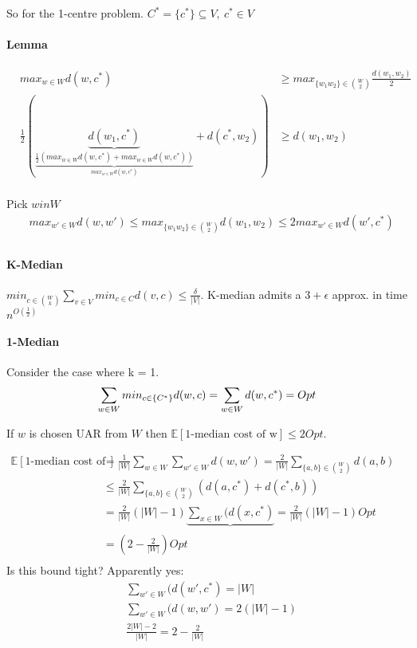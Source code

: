 \documentclass[]{article}
\begin{document}
So for the 1-centre problem. $ C^* = \{c^*\} \subseteq V,\ c^* \in V $\\
\paragraph{Lemma} 

\begin{align*}
&max_{w \in W} d(w, c^*) &\geq max_{\{w_1w_2\} \in {W \choose 2}} \frac{d(w_1, w_2)}{2}\\
&\frac{1}{2}(\underbrace{d(w_1, c^*)}_{\underbrace{\frac{1}{2}(max_{w \in W} d(w, c^*) + max_{w \in W} d(w, c^*))}_{max_{w \in W} d(w, c^*)}} + d(c^*, w_2) )&\geq d(w_1, w_2)\\
\end{align*}

Pick $ w in W $
\begin{align*}
&max_{w' \in W} d(w, w') \leq max_{\{w_1w_2\} \in {W \choose 2}} d(w_1, w_2) \leq 2max_{w' \in W} d(w', c^*)\\
\end{align*}

\paragraph{K-Median} $  min_{c \in {W \choose k}}  \sum\limits_{v \in V} min_{c \in C} d(v, c) \leq \frac{\delta}{|V|}$. K-median admits a $ 3+\epsilon $ approx. in time $n^{O(\frac{1}{2})}$

\paragraph{1-Median} Consider the case where k = 1.
\[
\sum\limits_{w\in W} min_{c\in \{C^*\}} d(w, c) = \sum\limits_{w\in W} d(w, c^*) = Opt\\
\]

If $ w $ is chosen UAR from $ W $ then $ \mathbb{E}[\text{1-median cost of w}] \leq 2Opt $. 

\begin{align*}
\mathbb{E}[\text{1-median cost of w}] &= \frac{1}{|W|} \sum\limits_{w\in W} \sum\limits_{w' \in W} d(w, w') = \frac{2}{|W|} \sum\limits_{\{a,b\} \in {W\choose 2}} d(a,b)\\
&\leq \frac{2}{|W|} \sum\limits_{\{a,b\} \in {W\choose 2}} \left(d(a,c^*) + d(c^*, b)\right)\\
&= \frac{2}{|W|}(|W|-1) \underbrace{\sum\limits_{x \in W} (d(x,c^*)}_{} = \frac{2}{|W|}(|W| -1) Opt &\\
&= \left(2 - \frac{2}{|W|}\right) Opt\\
\end{align*}
Is this bound tight? Apparently yes:
\begin{align*}
&\sum\limits_{w' \in W} (d(w',c^*) = |W|\\
&\sum\limits_{w' \in W} (d(w, w') = 2(|W|-1)\\
&\frac{2|W|-2}{|W|} = 2 - \frac{2}{|W|}
\end{align*}
\end{document}
